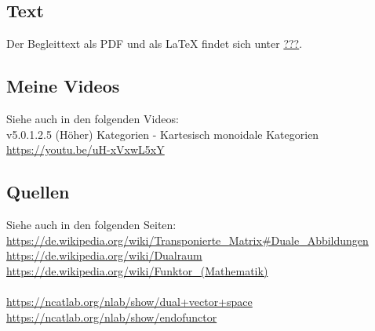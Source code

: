 \documentclass[a4paper]{amsart}
\theoremstyle{definition}
\begin{document}
\subsection*{Text}
Der Begleittext als PDF und als LaTeX findet sich unter
\url{???}.

\subsection*{Meine Videos}
Siehe auch in den folgenden Videos:\\
v5.0.1.2.5 (Höher) Kategorien - Kartesisch monoidale Kategorien\\
\url{https://youtu.be/uH-xVxwL5xY}\\

\subsection*{Quellen}
Siehe auch in den folgenden Seiten:\\
\url{https://de.wikipedia.org/wiki/Transponierte_Matrix#Duale_Abbildungen}\\
\url{https://de.wikipedia.org/wiki/Dualraum}\\
\url{https://de.wikipedia.org/wiki/Funktor_(Mathematik)}\\
\url{}\\
\url{https://ncatlab.org/nlab/show/dual+vector+space}\\
\url{https://ncatlab.org/nlab/show/endofunctor}\\
\url{}\\
\url{}\\

\end{document}
